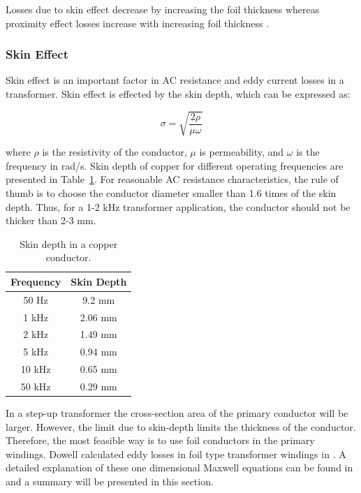 \documentclass[a4paper, 11pt]{article} %
\begin{document}
Losses due to skin effect decrease by increasing the foil thickness whereas proximity effect losses increase with increasing foil thickness \cite{Ortiz2010}.

\subsubsection{Skin Effect}

Skin effect is an important factor in AC resistance and eddy current losses in a transformer. Skin effect is effected by the skin depth, which can be expressed as:

\begin{equation}
  \sigma = \sqrt{\frac{2\rho}{\mu \omega}}
\end{equation}

where $\rho$ is the resistivity of the conductor, $\mu$ is permeability, and $\omega$ is the frequency in rad/s. Skin depth of copper for different operating frequencies are presented in Table~\ref{skin-depth}. For reasonable AC resistance characteristics, the rule of thumb is to choose the conductor diameter smaller than 1.6 times of the skin depth. Thus, for a 1-2 kHz transformer application, the conductor should not be thicker than 2-3 mm. 

\begin{table}[]
\begin{center}
\begin{tabular}{cc}
Frequency & Skin Depth \\
\hline
50 Hz & 9.2 mm \\
1 kHz & 2.06 mm \\
2 kHz & 1.49 mm \\
5 kHz & 0.94 mm \\
10 kHz & 0.65 mm \\
50 kHz & 0.29 mm \\
\hline
\end{tabular} 
\end{center}
\caption{Skin depth in a copper conductor.}
\label{skin-depth}
\end{table}

In a step-up transformer the cross-section area of the primary conductor will be larger. However, the limit due to skin-depth limits the thickness of the conductor. Therefore, the most feasible way is to use foil conductors in the primary windings. 
Dowell calculated eddy losses in foil type transformer windings in \cite{Dowell1966}. A detailed explanation of these one dimensional Maxwell equations can be found in \cite{Villar2010} and a summary will be presented in this section.
\end{document}
